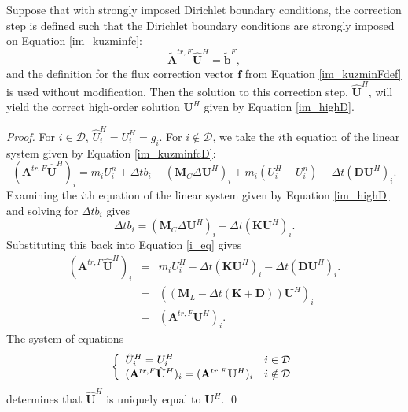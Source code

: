 \begin{lemma}
   Suppose that with strongly imposed Dirichlet boundary conditions, the
   correction step is defined such that the Dirichlet boundary conditions
   are strongly imposed on Equation \ref{im_kuzminfc}:
   \begin{equation}\label{im_kuzminfcD}
      \tilde{\mathbf{A}}^{tr,F}\hat{\mathbf{U}}^H
         = \tilde{\mathbf{b}}^F,
   \end{equation}
   and the definition for
   the flux correction vector $\mathbf{f}$ from
   Equation \ref{im_kuzminFdef} is used without modification. Then the solution
   to this correction step, $\hat{\mathbf{U}}^H$, will yield the
   correct high-order solution $\mathbf{U}^H$ given by Equation \ref{im_highD}.
\end{lemma}
\begin{proof}
   For $i\in\mathcal{D}$, $\hat{U}^H_i = U^H_i = g_i$. For $i\notin\mathcal{D}$,
   we take the $i$th equation of the linear system given by Equation \ref{im_kuzminfcD}:
   \begin{equation}\label{i_eq}
      (\mathbf{A}^{tr,F}\hat{\mathbf{U}}^H)_i
         = m_i U^n_i + \Delta t b_i - (\mathbf{M}_C\Delta\mathbf{U}^H)_i
         + m_i(U^H_i-U^n_i) - \Delta t(\mathbf{D}\mathbf{U}^H)_i.
   \end{equation}
   Examining the $i$th equation of the linear system given by Equation \ref{im_highD}
   and solving for $\Delta t b_i$ gives
   \begin{equation}
      \Delta t b_i = (\mathbf{M}_C\Delta\mathbf{U}^H)_i
         - \Delta t(\mathbf{K}\mathbf{U}^H)_i.
   \end{equation}
   Substituting this back into Equation \ref{i_eq} gives
   \begin{eqnarray}
      (\mathbf{A}^{tr,F}\hat{\mathbf{U}}^H)_i
         & = & m_i U^H_i - \Delta t(\mathbf{K}\mathbf{U}^H)_i -
            \Delta t(\mathbf{D}\mathbf{U}^H)_i.\\
         & = & \left((\mathbf{M}_L - \Delta t(\mathbf{K}+\mathbf{D}))\mathbf{U}^H\right)_i\\
         & = &(\mathbf{A}^{tr,F}\mathbf{U}^H)_i.
   \end{eqnarray}
   The system of equations
   \begin{equation}
      \left\{
         \begin{array}{l l}
            \hat{U}^H_i = U^H_i & i\in\mathcal{D}\\
            (\mathbf{A}^{tr,F}\hat{\mathbf{U}}^H)_i = (\mathbf{A}^{tr,F}\mathbf{U}^H)_i
               & i\notin\mathcal{D}
         \end{array}
      \right.
   \end{equation}
   determines that $\hat{\mathbf{U}}^H$ is uniquely equal to $\mathbf{U}^H$.
   \qed
\end{proof}
